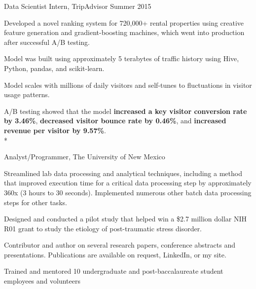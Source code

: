 \documentclass[print]{friggeri-cv} %
\begin{document}
\begin{description} \itemsep1pt \parskip0pt 
  \item {\largeheaderfont Data Scientist Intern, TripAdvisor } \hfill
    {\smallheaderfont Summer 2015}
    \begin{myitemize} \itemsep1pt \parskip1pt 
      \item Developed a novel ranking system for
            720,000+ rental properties using creative feature generation and
            gradient-boosting machines, which went into production after
            successful A/B testing.
      \item Model was built using approximately 5 terabytes of traffic
            history using Hive, Python, pandas, and scikit-learn.
      \item Model scales with millions of daily visitors and self-tunes to
            fluctuations in visitor usage patterns.
      \item A/B testing showed that the model \textbf{increased a key visitor conversion
            rate by 3.46\%}, \textbf{decreased visitor bounce rate by 0.46\%},
            and \textbf{increased revenue per visitor by 9.57\%}.\\*
    \end{myitemize}

  \item {\largeheaderfont Analyst/Programmer, The University of New Mexico} \hfill 
    { }
    \begin{myitemize} \itemsep0.5pt \parskip0pt 
      \item Streamlined lab data processing and analytical techniques, including a
        method that improved execution time for a critical data processing step by approximately 360x
        (3 hours to 30 seconds). Implemented numerous other batch data processing
        steps for other tasks.
      \item Designed and conducted a pilot study that helped win a \$2.7 million
        dollar NIH R01 grant to study the etiology of post-traumatic stress
        disorder.
      \item Contributor and author on several research papers, conference abstracts and
        presentations. Publications are available on request, LinkedIn, or my site.
      \item Trained and mentored 10 undergraduate and post-baccalaureate student
        employees and volunteers
    \end{myitemize}


\end{description}
\end{document}

